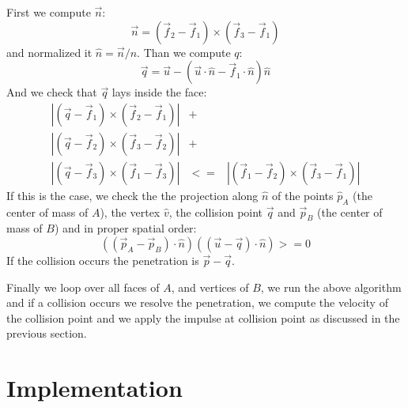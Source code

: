 \documentclass[12pt]{article}
\begin{document}
First we compute $\vec n$:
\begin{equation}
\vec n = (\vec f_2 - \vec f_1) \times (\vec f_3 - \vec f_1)
\end{equation}
and normalized it $\hat n = \vec n / n$.
Than we compute $q$:
\begin{equation}
\vec q = \vec u - (\vec u \cdot \hat n - \vec f_1 \cdot \hat n){\hat n}
\end{equation}
And we check that $\vec q$ lays inside the face:
\begin{eqnarray}
|(\vec q - \vec f_1)\times(\vec f_2-\vec f_1)|&+& \\
|(\vec q - \vec f_2)\times(\vec f_3-\vec f_2)|&+& \\
|(\vec q - \vec f_3)\times(\vec f_1-\vec f_3)| &<=& |(\vec f_1 - \vec f_2)\times(\vec f_3-\vec f_1)|
\end{eqnarray}
If this is the case, we check the the projection along $\hat n$ of the points $\hat p_A$ (the center of mass of $A$), the vertex $\hat v$, the collision point $\vec q$ and $\vec p_B$ (the center of mass of $B$) and in proper spatial order:
\begin{equation}
((\vec p_A - \vec p_B) \cdot \hat n) ((\vec u - \vec q) \cdot\hat n) >=0
\end{equation}
If the collision occurs the penetration is $\vec p - \vec q$.

Finally we loop over all faces of $A$, and vertices of $B$, we run the above algorithm and if a collision occurs we resolve the penetration, we compute the velocity of the collision point and we apply the impulse at collision point as discussed in the previous section.

\section{Implementation}


\end{document}
